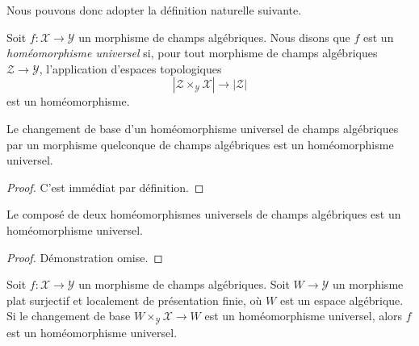\noindent
Nous pouvons donc adopter la définition naturelle suivante.

\begin{definition}
\label{definition-universal-homeomorphism}
Soit $f : \mathcal{X} \to \mathcal{Y}$ un morphisme de champs algébriques.
Nous disons que $f$ est un {\it homéomorphisme universel} si, pour tout
morphisme de champs algébriques $\mathcal{Z} \to \mathcal{Y}$,
l'application d'espaces topologiques
$$
|\mathcal{Z} \times_\mathcal{Y} \mathcal{X}| \to |\mathcal{Z}|
$$
est un homéomorphisme.
\end{definition}

\begin{lemma}
\label{lemma-base-change-universal-homeomorphism}
Le changement de base d'un homéomorphisme universel de champs algébriques
par un morphisme quelconque de champs algébriques est un homéomorphisme
universel.
\end{lemma}

\begin{proof}
C'est immédiat par définition.
\end{proof}

\begin{lemma}
\label{lemma-composition-universal-homeomorphism}
Le composé de deux homéomorphismes universels de champs algébriques
est un homéomorphisme universel.
\end{lemma}

\begin{proof}
Démonstration omise.
\end{proof}

\begin{lemma}
\label{lemma-check-universal-homeomorphism-covering}
Soit $f : \mathcal{X} \to \mathcal{Y}$ un morphisme de champs algébriques.
Soit $W \to \mathcal{Y}$ un morphisme plat surjectif et localement
de présentation finie, où $W$ est un espace algébrique. Si le changement
de base $W \times_\mathcal{Y} \mathcal{X} \to W$ est un homéomorphisme
universel, alors $f$ est un homéomorphisme universel.
\end{lemma}

